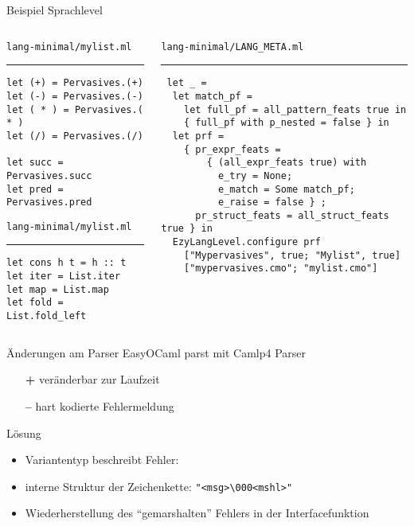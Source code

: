 \documentclass
[handout]
{beamer}
\begin{document}
\begin{frame}[fragile]{Beispiel Sprachlevel}
  \begin{columns}
    \begin{column}{0.4\linewidth}
  \texttt{lang-minimal/mylist.ml}
  \hrule
  \begin{scriptsize}\begin{verbatim}
let (+) = Pervasives.(+)
let (-) = Pervasives.(-)
let ( * ) = Pervasives.( * )
let (/) = Pervasives.(/)

let succ = Pervasives.succ
let pred = Pervasives.pred
  \end{verbatim}\end{scriptsize}
  \texttt{lang-minimal/mylist.ml}
  \hrule
  \begin{scriptsize}\begin{verbatim}
let cons h t = h :: t
let iter = List.iter
let map = List.map
let fold = List.fold_left
  \end{verbatim}\end{scriptsize}
    \end{column}
    \begin{column}{0.6\linewidth}
  \texttt{lang-minimal/LANG\_META.ml}
  \hrule
  \begin{scriptsize}\begin{verbatim}
 let _ =
  let match_pf =
    let full_pf = all_pattern_feats true in
    { full_pf with p_nested = false } in
  let prf = 
    { pr_expr_feats =
        { (all_expr_feats true) with
          e_try = None;
          e_match = Some match_pf;
          e_raise = false } ;
      pr_struct_feats = all_struct_feats true } in
  EzyLangLevel.configure prf
    ["Mypervasives", true; "Mylist", true] 
    ["mypervasives.cmo"; "mylist.cmo"]
  \end{verbatim}\end{scriptsize}
    \end{column}
  \end{columns}
\end{frame}

\begin{frame}{Änderungen am Parser}
  EasyOCaml parst mit Camlp4 Parser
  \begin{itemize}
    \item[{\bf\small +}] veränderbar zur Laufzeit
    \item[{\bf\small --}] hart kodierte Fehlermeldung
  \end{itemize}
  Lösung
  \begin{itemize}
    \item Variantentyp beschreibt Fehler: \\
    \item interne Struktur der Zeichenkette: \texttt{"<msg>\textbackslash 000<mshl>"}
    \item Wiederherstellung des ``gemarshalten'' Fehlers in der Interfacefunktion 
  \end{itemize}
\end{frame}
\end{document}
